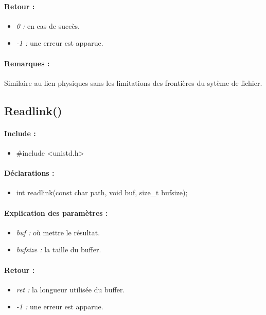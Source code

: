 \documentclass{article}[12pt]
\begin{document}
\paragraph{Retour : }
\begin{itemize}
	\item \emph{0 : } en cas de succès.
	\item \emph{-1 : } une erreur est apparue.
\end{itemize}
\paragraph{Remarques : }
Similaire au lien physiques sans les limitations des frontières du sytème de fichier.
\subsection{Readlink()}
\paragraph{Include : }
\begin{itemize}
	\item \#include <unistd.h>
\end{itemize}
\paragraph{Déclarations : }
\begin{itemize}
	\item int readlink(const char \* path, void \* buf, size\_t bufsize);
\end{itemize}
\paragraph{Explication des paramètres : }
\begin{itemize}
	\item \emph{buf : } où mettre le résultat.
	\item \emph{bufsize : } la taille du buffer.
\end{itemize}
\paragraph{Retour : }
\begin{itemize}
	\item \emph{ret : } la longueur utilisée du buffer. 
	\item \emph{-1 : } une erreur est apparue.
\end{itemize}
\end{document}
